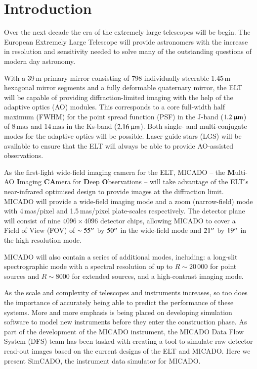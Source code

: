 \section{Introduction}
\label{sec:Introduction}

Over the next decade the era of the extremely large telescopes will be begin. The European Extremely Large Telescope \citep[ELT, ][]{eelt} will provide astronomers with the increase in resolution and sensitivity needed to solve many of the outstanding questions of modern day astronomy. 

With a 39\,m primary mirror consisting of 798 individually steerable 1.45\,m hexagonal mirror segments and a fully deformable quaternary mirror, the ELT will be capable of providing diffraction-limited imaging with the help of the adaptive optics (AO) modules. This corresponds to a core full-width half maximum (FWHM) for the point spread function (PSF) in the J-band ($1.2\,\upmu\mathrm{m}$) of $8\,\mathrm{mas}$ and $14\,\mathrm{mas}$ in the Ks-band ($2.16\,\upmu\mathrm{m}$). Both single- and multi-conjugate modes for the adaptive optics will be possible. Laser guide stars (LGS) will be available to ensure that the ELT will always be able to provide AO-assisted observations. 

As the first-light wide-field imaging camera for the ELT, MICADO -- the \textbf{M}ulti-AO \textbf{I}maging \textbf{CA}mera for \textbf{D}eep \textbf{O}bservations \citep{micado} -- will take advantage of the ELT's near-infrared optimised design to provide images at the diffraction limit. MICADO will provide a wide-field imaging mode and a zoom (narrow-field) mode with 4\,mas/pixel and 1.5\,mas/pixel plate-scales respectively. The detector plane will consist of nine $4096\times 4096$ detector chips, allowing MICADO to cover a Field of View (FOV) of $\sim55^{\prime\prime}$ by $50^{\prime\prime}$ in the wide-field mode and $21^{\prime\prime}$ by $19^{\prime\prime}$ in the high resolution mode.

MICADO will also contain a series of additional modes, including: a long-slit spectrographic mode with a spectral resolution of up to $R\sim20\,000$ for point sources and $R\sim8000$ for extended sources, and a high-contrast imaging mode.

As the scale and complexity of telescopes and instruments increases, so too does the importance of accurately being able to predict the performance of these systems. More and more emphasis is being placed on developing simulation software to model new instruments before they enter the construction phase. As part of the development of the MICADO instrument, the MICADO Data Flow System (DFS) team has been tasked with creating a tool to simulate raw detector read-out images based on the current designs of the ELT and MICADO. Here we present SimCADO, the instrument data simulator for MICADO. 


